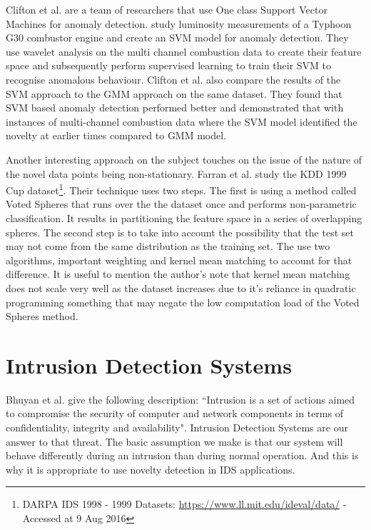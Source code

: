 \documentclass[reqno,openany,12pt]{amsbook}
\begin{document}
Clifton et al.\cite{out2} are a team of researchers that use One class Support Vector Machines for anomaly detection. study luminosity measurements of a Typhoon G30 combustor engine and create an SVM model
for anomaly detection. They use wavelet analysis on the multi channel combustion data to create their feature space and subsequently perform supervised learning to train their SVM to recognise anomalous behaviour. Clifton et al. also compare the results of the SVM approach to the GMM approach on the same dataset. They found that SVM based anomaly detection performed better and demonstrated that with instances of multi-channel combustion data where the SVM model identified the novelty at earlier times compared to GMM model.

Another interesting approach on the subject touches on the issue of the nature of the novel data points being non-stationary. Farran et al.\cite{out5} study the KDD  1999 Cup dataset\footnote{DARPA IDS 1998 - 1999 Datasets: \url{https://www.ll.mit.edu/ideval/data/} - Accessed at 9 Aug 2016}.
Their technique uses two steps. The first is using a method called Voted Spheres that runs over the the dataset once and performs non-parametric classification. It results in partitioning the feature space in a series of overlapping spheres. The second step is to take into account the possibility that the test set may not come from the same distribution as the training set. The use two algorithms, important weighting and kernel mean matching to account for that difference. It is useful to mention the author's note that kernel mean matching does not scale very well as the dataset increases due to it's reliance in quadratic programming something that may negate the low computation load of the Voted Spheres method.




\section{Intrusion Detection Systems}

Bhuyan et al.\cite{ids1} give the following description: ``Intrusion is a set of actions aimed to compromise the security of computer and network components in terms of confidentiality, integrity and availability". Intrusion Detection Systems are our answer to that threat. The basic assumption we make is that our system will behave differently during an intrusion than during normal operation. And this is why it is appropriate to use novelty detection in IDS applications.
\end{document}
